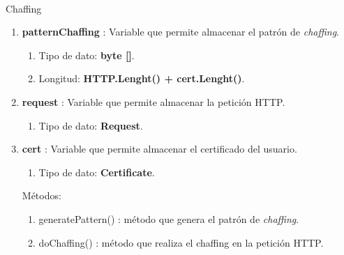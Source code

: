 \documentclass[12pt, a4paper, titlepage]{report}
\begin{document}
			    \paragraph{}
	            \large Chaffing
			    \begin{enumerate}
    		        \item \textbf{patternChaffing} : Variable que permite almacenar el patrón de \textit{chaffing}.
    		        \begin{enumerate}
    		            \item Tipo de dato: \textbf{byte []}.
    		            \item Longitud: \textbf{HTTP.Lenght() + cert.Lenght()}.
    		        \end{enumerate}
    		        \item \textbf{request} : Variable que permite almacenar la petición HTTP.
    		        \begin{enumerate}
    		            \item Tipo de dato: \textbf{Request}.
    		        \end{enumerate}
    		        \item \textbf{cert} : Variable que permite almacenar el certificado del usuario.
    		        \begin{enumerate}
    		            \item Tipo de dato: \textbf{Certificate}.
    		        \end{enumerate}
    		        
    		        Métodos:
    		        \begin{enumerate}
    		            \item generatePattern() : método que genera el patrón de \textit{chaffing}.
    		            \item doChaffing() : método que realiza el chaffing en la petición HTTP.
    		        \end{enumerate}
			    \end{enumerate}
\end{document}
